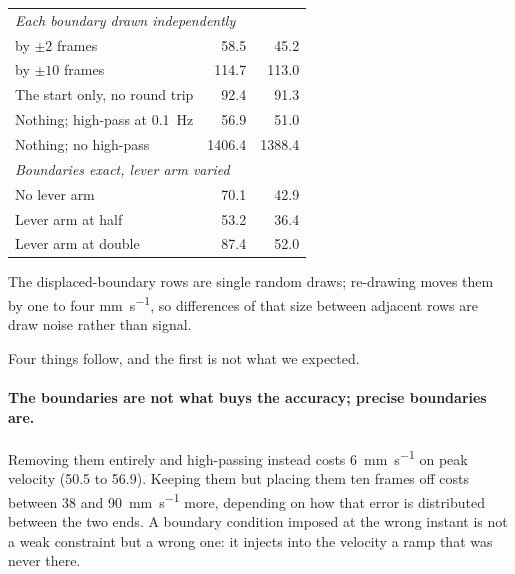 \begin{table}[t]
\begin{tabular}{lrr}
    \multicolumn{3}{l}{\emph{Each boundary drawn independently}} \\
    \quad by $\pm 2$ frames                 & 58.5   & 45.2 \\
    \quad by $\pm 10$ frames                & 114.7  & 113.0 \\
    \midrule
    The start only, no round trip            & 92.4   & 91.3 \\
    \midrule
    Nothing; high-pass at \SI{0.1}{\hertz}   & 56.9   & 51.0 \\
    Nothing; no high-pass                    & 1406.4 & 1388.4 \\
    \midrule
    \multicolumn{3}{l}{\emph{Boundaries exact, lever arm varied}} \\
    No lever arm                             & 70.1   & 42.9 \\
    Lever arm at half                        & 53.2   & 36.4 \\
    Lever arm at double                      & 87.4   & 52.0 \\
    \bottomrule
  \end{tabular}
\end{table}

The displaced-boundary rows are single random draws; re-drawing moves them by one to four
\si{\milli\metre\per\second}, so differences of that size between adjacent rows are draw
noise rather than signal.

Four things follow, and the first is not what we expected.


\paragraph{The boundaries are not what buys the accuracy; precise boundaries are.}
Removing them entirely and high-passing instead costs
\SI{6}{\milli\metre\per\second} on peak velocity (\num{50.5} to
\num{56.9}). Keeping them but placing them ten frames off costs between \num{38} and
\SI{90}{\milli\metre\per\second} more, depending on how that error is distributed
between the two ends. A boundary condition imposed at the wrong instant is not a weak
constraint but a wrong one: it injects into the velocity a ramp that was never there.

